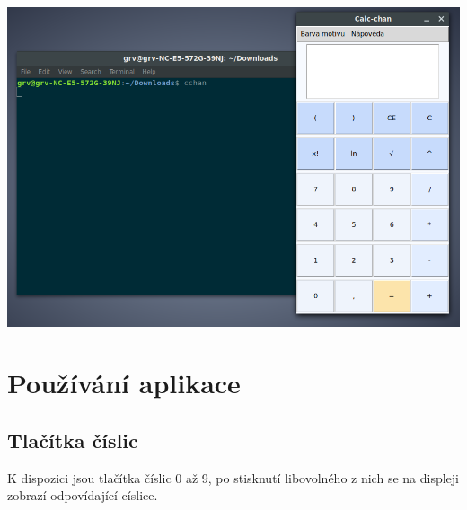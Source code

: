 \documentclass[a4paper, 11pt]{article}
\begin{document}
\begin{center}
\includegraphics[scale=0.5]{cchanrun}
\end{center}

\newpage
\section{Používání aplikace}
\subsection*{Tlačítka číslic}
K dispozici jsou tlačítka číslic 0 až 9, po stisknutí libovolného z nich se na displeji zobrazí odpovídající císlice.

\newpage
\end{document}
